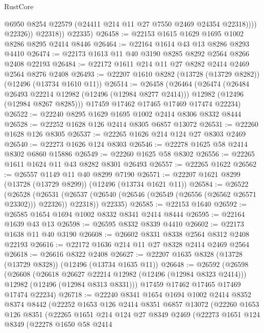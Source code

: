 \begin{lexlean}{RustCore}
\begin{coremodule}
                    @6950
                    @8254
                    @22579
                    (@24411 @214 @11 @27 @7550 @2469 @24354 @22318))))
              @22326))
          @22318))
      @22335)
@26458 := @22153 @1615 @1629 @1695 @1002 @8286 @8295 @2414 @8446
@26464 := @22164 @1614 @43 @13 @8286 @8293 @4410
@26474 := @22173 @1613 @11 @40 @3190 @8285 @8292 @2564 @8266 @2408 @22193
@26484 := @22172 @1611 @214 @11 @27 @8282 @2414 @2469 @2564 @8276 @2408
@26493 := @22207 @1610 @8282 (@13728 (@13729 @8282)) (@12496 (@13734 @1610 @11))
@26514 := @26458
    (@26464
      (@26474
        (@26484 @26493 @22214 @12982 (@12496 (@12984 @8277 @2414)))
        @12982
        (@12496 (@12984 @8267 @8285)))
      @17459
      @17462
      @17465
      @17469
      @17474
      @22234)
@26522 := @22240 @8295 @1629 @1695 @1002 @2414 @8306 @8332 @8444
@26528 := @22252 @1628 @126 @2414 @8305 @6857 @13072
@26531 := @22260 @1628 @126 @8305
@26537 := @22265 @1626 @214 @124 @27 @8303 @2469
@26540 := @22273 @1626 @124 @8303
@26546 := @22278 @1625 @58 @2414 @8302 @6860 @15886
@26549 := @22260 @1625 @58 @8302
@26556 := @22265 @1611 @1624 @11 @43 @8282 @8301 @26493
@26557 := @22265 @1622
@26562 := @26557 @1149 @11 @40 @8299 @7190
@26571 := @22207 @1621 @8299 (@13728 (@13729 @8299)) (@12496 (@13734 @1621 @11))
@26584 := @26522
    (@26528
      (@26531 (@26537 (@26540 (@26546 (@26549 (@26556 (@26562 @26571 @23302))) @22326)) @22318))
      @22335)
@26585 := @22153 @1640
@26592 := @26585 @1654 @1694 @1002 @8332 @8341 @2414 @8444
@26595 := @22164 @1639 @43 @13
@26598 := @26595 @8332 @8339 @4410
@26602 := @22173 @1638 @11 @40 @3190
@26608 := @26602 @8331 @8338 @2564 @8312 @2408 @22193
@26616 := @22172 @1636 @214 @11 @27 @8328 @2414 @2469 @2564
@26618 := @26616 @8322 @2408
@26627 := @22207 @1635 @8328 (@13728 (@13729 @8328)) (@12496 (@13734 @1635 @11))
@26648 := @26592
    (@26598
      (@26608
        (@26618 @26627 @22214 @12982 (@12496 (@12984 @8323 @2414)))
        @12982
        (@12496 (@12984 @8313 @8331)))
      @17459
      @17462
      @17465
      @17469
      @17474
      @22234)
@26718 := @22240
    @8341
    @1654
    @1694
    @1002
    @2414
    @8352
    @8374
    @8442
    (@22252
      @1653
      @126
      @2414
      @8351
      @6857
      @13072
      (@22260
        @1653
        @126
        @8351
        (@22265
          @1651
          @214
          @124
          @27
          @8349
          @2469
          (@22273
            @1651
            @124
            @8349
            (@22278
              @1650
              @58
              @2414

\end{coremodule}
\end{lexlean}
